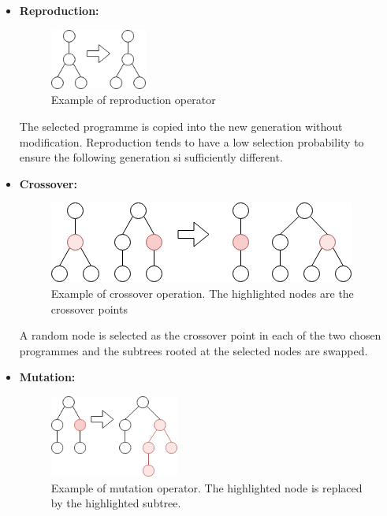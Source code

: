 \documentclass{article}
\begin{document}
        \begin{itemize}
            \item \textbf{Reproduction:} 
            
            \begin{figure}[h]
                \centering
                \includegraphics[width=0.3\textwidth]{5_reproduction}
                \caption{Example of reproduction operator}
                \label{fig:reproduction}
            \end{figure}
            
            The selected programme is copied into the new generation without modification. Reproduction tends to have a low selection probability to ensure the following generation si sufficiently different.
            
            \item \textbf{Crossover:} 
            
            \begin{figure}[h]
                \centering
                \includegraphics[height=0.2\textwidth]{6_crossover}
                \caption{Example of crossover operation. The highlighted nodes are the crossover points}
                \label{fig:crossover}
            \end{figure}
            
            A random node is selected as the crossover point in each of the two chosen programmes and the subtrees rooted at the selected nodes are swapped.
            
            
            \item \textbf{Mutation:} 
            
            \begin{figure}[h]
                \centering
                \includegraphics[width=0.4\textwidth]{7_mutation}
                \caption{Example of mutation operator. The highlighted node is replaced by the highlighted subtree.}
                \label{fig:mutation}
            \end{figure}
            

\end{itemize}
\end{document}
